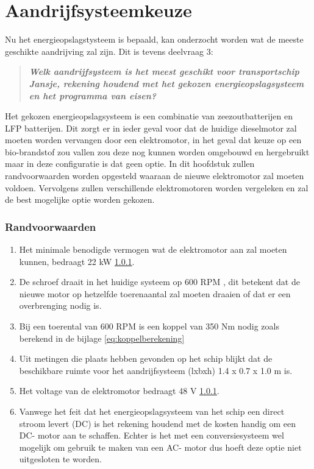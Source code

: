 \chapter{Aandrijfsysteemkeuze}
\label{ch:aandrijfsysteemkeuze}

\noindent Nu het energieopslagstysteem is bepaald, kan onderzocht worden wat de meeste geschikte aandrijving zal zijn. Dit is tevens deelvraag 3:
\begin{quote}
    \textit{\textbf{Welk aandrijfsysteem is het meest geschikt voor transportschip Jansje, rekening houdend met
het gekozen energieopslagsysteem en het programma van eisen?}}
\end{quote}
\noindent Het gekozen energieopslagsysteem is een combinatie van zeezoutbatterijen en LFP batterijen. Dit zorgt er in ieder geval voor dat de huidige dieselmotor zal moeten worden vervangen door een elektromotor, in het geval dat keuze op een bio-brandstof zou vallen zou deze nog kunnen worden omgebouwd en hergebruikt maar in deze configuratie is dat geen optie. In dit hoofdstuk zullen randvoorwaarden worden opgesteld waaraan de nieuwe elektromotor zal moeten voldoen. Vervolgens zullen verschillende elektromotoren worden vergeleken en zal de best mogelijke optie worden gekozen.

\subsection{Randvoorwaarden}
\begin{enumerate}
    \item Het minimale benodigde vermogen wat de elektromotor aan zal moeten kunnen, bedraagt 22 kW \ref{}.
    \item De schroef draait in het huidige systeem op 600 RPM \cite{mail arnold}, dit betekent dat de nieuwe motor op hetzelfde toerenaantal zal moeten draaien of dat er een overbrenging nodig is.
    \item Bij een toerental van 600 RPM is een koppel van 350 Nm nodig zoals berekend in de bijlage \ref{eq:koppelberekening}
    \item Uit metingen die plaats hebben gevonden op het schip blijkt dat de beschikbare ruimte voor het aandrijfsysteem (lxbxh) 1.4 x 0.7 x 1.0 m is.
    \item Het voltage van de elektromotor bedraagt 48 V \ref{}.
    \item Vanwege het feit dat het energieopslagsysteem van het schip een direct stroom levert (DC) \cite{} is het rekening houdend met de kosten handig om een DC- motor aan te schaffen. Echter is het met een conversiesysteem wel mogelijk om gebruik te maken van een AC- motor dus hoeft deze optie niet uitgesloten te worden.
\end{enumerate}



